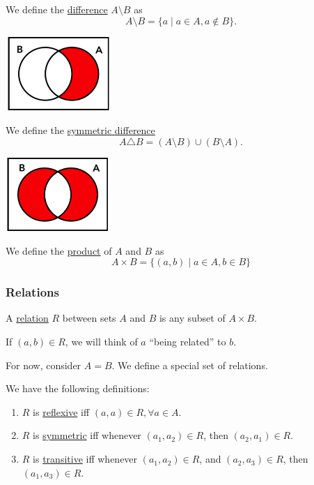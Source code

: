 \begin{definition}
    We define the \ul{difference} $A\setminus B$ as
    \[A\setminus B = \{a\mid a\in A, a\not\in B\}.\]
    \begin{center}
        \includegraphics[width=0.3\textwidth]{images/set_difference.png}
    \end{center}
\end{definition}
\begin{definition}
    We define the \ul{symmetric difference}
    \[A\triangle B = (A\setminus B)\cup (B\setminus A).\]
    \begin{center}
        \includegraphics[width=0.3\textwidth]{images/set_sym_difference.png}
    \end{center}
\end{definition}
\begin{definition}
    We define the \ul{product} of $A$ and $B$ as
    \[A\times B = \{(a, b)\mid a\in A, b\in B\}\]
\end{definition}

\subsubsection{Relations}
\begin{definition}[Relations]
    A \ul{relation} $R$ between sets $A$ and $B$ is any subset of $A\times B$.

    If $(a, b)\in R$, we will think of $a$ ``being related'' to $b$.
\end{definition}

For now, consider $A = B$. We define a special set of relations.
\begin{definition}\label{defn:rst-relations}
    We have the following definitions:
    \begin{enumerate}
        \item $R$ is \ul{reflexive} iff $(a, a)\in R, \forall a\in A$.
        \item $R$ is \ul{symmetric} iff whenever $(a_1, a_2)\in R$, then $(a_2, a_1)\in R$.
        \item $R$ is \ul{transitive} iff whenever $(a_1, a_2)\in R$, and $(a_2, a_3)\in R$, then $(a_1, a_3)\in R$.
    \end{enumerate}
\end{definition}

